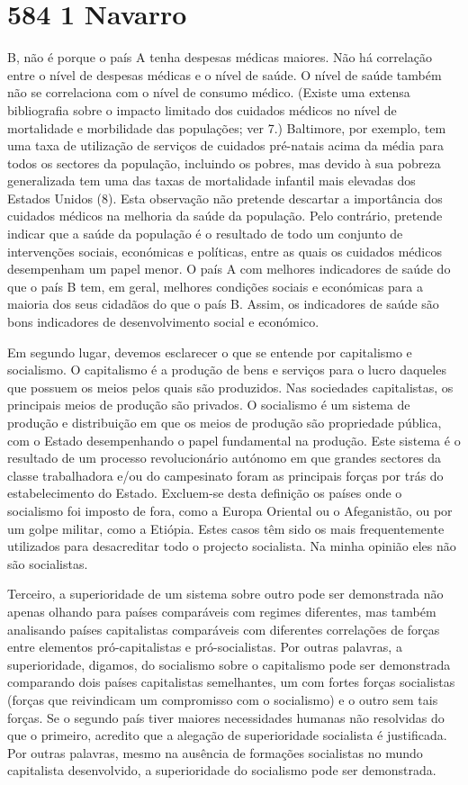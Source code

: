 \section{584 1 Navarro}
 \par 
B, não é porque o país A tenha despesas médicas maiores. Não há correlação entre o nível de despesas médicas e o nível de saúde. O nível de saúde também não se correlaciona com o nível de consumo médico. (Existe uma extensa bibliografia sobre o impacto limitado dos cuidados médicos no nível de mortalidade e morbilidade das populações; ver {\color{blue}7}.) Baltimore, por exemplo, tem uma taxa de utilização de serviços de cuidados pré-natais acima da média para todos os sectores da população, incluindo os pobres, mas devido à sua pobreza generalizada tem uma das taxas de mortalidade infantil mais elevadas dos Estados Unidos (8). Esta observação não pretende descartar a importância dos cuidados médicos na melhoria da saúde da população. Pelo contrário, pretende indicar que a saúde da população é o resultado de todo um conjunto de intervenções sociais, económicas e políticas, entre as quais os cuidados médicos desempenham um papel menor. O país A com melhores indicadores de saúde do que o país B tem, em geral, melhores condições sociais e económicas para a maioria dos seus cidadãos do que o país B. Assim, os indicadores de saúde são bons indicadores de desenvolvimento social e económico.
 \par 
Em segundo lugar, devemos esclarecer o que se entende por capitalismo e socialismo. O capitalismo é a produção de bens e serviços para o lucro daqueles que possuem os meios pelos quais são produzidos. Nas sociedades capitalistas, os principais meios de produção são privados. O socialismo é um sistema de produção e distribuição em que os meios de produção são propriedade pública, com o Estado desempenhando o papel fundamental na produção. Este sistema é o resultado de um processo revolucionário autónomo em que grandes sectores da classe trabalhadora e/ou do campesinato foram as principais forças por trás do estabelecimento do Estado. Excluem-se desta definição os países onde o socialismo foi imposto de fora, como a Europa Oriental ou o Afeganistão, ou por um golpe militar, como a Etiópia. Estes casos têm sido os mais frequentemente utilizados para desacreditar todo o projecto socialista. Na minha opinião eles não são socialistas.
 \par 
Terceiro, a superioridade de um sistema sobre outro pode ser demonstrada não apenas olhando para países comparáveis ​​com regimes diferentes, mas também analisando países capitalistas comparáveis ​​com diferentes correlações de forças entre elementos pró-capitalistas e pró-socialistas. Por outras palavras, a superioridade, digamos, do socialismo sobre o capitalismo pode ser demonstrada comparando dois países capitalistas semelhantes, um com fortes forças socialistas (forças que reivindicam um compromisso com o socialismo) e o outro sem tais forças. Se o segundo país tiver maiores necessidades humanas não resolvidas do que o primeiro, acredito que a alegação de superioridade socialista é justificada. Por outras palavras, mesmo na ausência de formações socialistas no mundo capitalista desenvolvido, a superioridade do socialismo pode ser demonstrada.
 \par 
